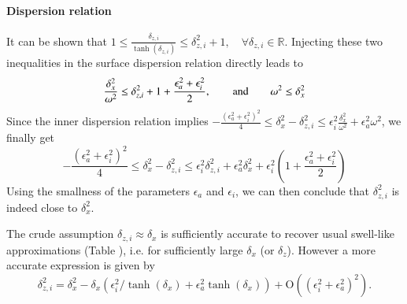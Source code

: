 \paragraph{Dispersion relation}
%
It can be shown that $\displaystyle 1\le \frac{\delta_{z,i}}{\tanh(\delta_{z,i})}\le \delta_{z,i}^2+1, \quad \forall \delta_{z,i}\in\mathbb{R}$. Injecting these two inequalities in the surface dispersion relation directly leads to 
\[
\frac{\delta_x^2}{\omega^2}\le \delta_{z,i}^2+1+\frac{\epsilon_a^2+\epsilon_i^2}{2}, \qquad \hbox{and}\qquad \omega^2 \le \delta_x^2
\]
%
Since  
the inner dispersion relation  implies 
$\displaystyle
-\frac{(\epsilon_a^2+\epsilon_i^2)^2}{4}\le \delta_x^2 - \delta_{z,i}^2 
\le \epsilon_i^2\frac{\delta_x^2}
{\omega^2}+\epsilon_a^2\omega^2$, we finally get
%
\[
-\frac{(\epsilon_a^2+\epsilon_i^2)^2}{4}\le \delta_x^2 - \delta_{z,i}^2 
\le \epsilon_i^2 \delta_{z,i}^2+\epsilon_a^2\delta_x^2
+\epsilon_i^2\left(1+\frac{\epsilon_a^2+\epsilon_i^2}{2}\right)
\]
%
Using the smallness of the parameters $\epsilon_a$ and $\epsilon_i$, we can then conclude that $\delta_{z,i}^2$ is indeed close to $\delta_x^2$. 
\par
%
The crude  assumption $\delta_{z,i} \approx \delta_x$ is sufficiently accurate to recover usual swell-like approximations (Table ), i.e. for sufficiently large $\delta_x$ (or $\delta_z$). However a more accurate expression is given by
\begin{equation}
\delta_{z,i}^2=\delta_x^2
-\delta_x\left(
\epsilon_i^2/\tanh(\delta_x)+\epsilon_a^2\tanh(\delta_x)
\right)
+\mathrm{O}	((\epsilon_i^2+\epsilon_a^2)^2).
\label{longMSW}
\end{equation}

